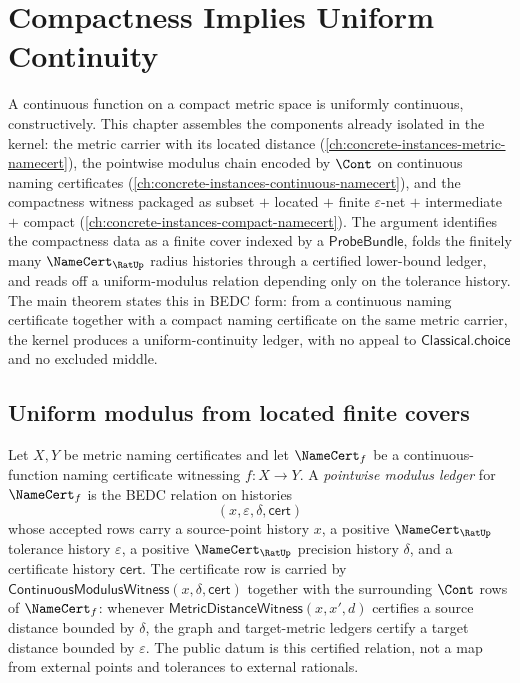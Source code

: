 \chapter{Compactness Implies Uniform Continuity}
\label{ch:capstones-compact-uniform-continuity}

A continuous function on a compact metric space is uniformly continuous, constructively. This chapter assembles the components already isolated in the kernel: the metric carrier with its located distance (\autoref{ch:concrete-instances-metric-namecert}), the pointwise modulus chain encoded by $\Cont$ on continuous naming certificates (\autoref{ch:concrete-instances-continuous-namecert}), and the compactness witness packaged as subset $+$ located $+$ finite $\varepsilon$-net $+$ intermediate $+$ compact (\autoref{ch:concrete-instances-compact-namecert}). The argument identifies the compactness data as a finite cover indexed by a $\mathsf{ProbeBundle}$, folds the finitely many $\NameCert_{\RatUp}$ radius histories through a certified lower-bound ledger, and reads off a uniform-modulus relation depending only on the tolerance history. The main theorem states this in BEDC form: from a continuous naming certificate together with a compact naming certificate on the same metric carrier, the kernel produces a uniform-continuity ledger, with no appeal to $\mathsf{Classical.choice}$ and no excluded middle.

\section{Uniform modulus from located finite covers}
\label{sec:compact-uniform-continuity-uniform-modulus}

\begin{definition}
\label{def:compact-uniform-pointwise-modulus}
Let $X, Y$ be metric naming certificates and let $\NameCert_f$ be a continuous-function naming certificate witnessing $f \colon X \to Y$. A \emph{pointwise modulus ledger} for $\NameCert_f$ is the BEDC relation on histories
$$
(x,\varepsilon,\delta,\mathsf{cert})
$$
whose accepted rows carry a source-point history $x$, a positive $\NameCert_{\RatUp}$ tolerance history $\varepsilon$, a positive $\NameCert_{\RatUp}$ precision history $\delta$, and a certificate history $\mathsf{cert}$. The certificate row is carried by $\mathsf{ContinuousModulusWitness}(x,\delta,\mathsf{cert})$ together with the surrounding $\Cont$ rows of $\NameCert_f$: whenever $\mathsf{MetricDistanceWitness}(x,x',d)$ certifies a source distance bounded by $\delta$, the graph and target-metric ledgers certify a target distance bounded by $\varepsilon$. The public datum is this certified relation, not a map from external points and tolerances to external rationals.
\end{definition}


